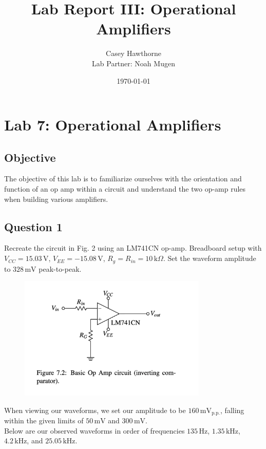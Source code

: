 \documentclass{article}
\title{Lab Report III: Operational Amplifiers}
\author{Casey Hawthorne \\ Lab Partner: Noah Mugen}
\date{\today}
\begin{document}
\maketitle

\section*{Lab 7: Operational Amplifiers}

\subsection*{Objective}
The objective of this lab is to familiarize ourselves with the orientation 
and function of an op amp within a circuit and understand the two op-amp rules 
when building various amplifiers.

\subsection*{Question 1}
Recreate the circuit in Fig. 2 using an LM741CN op-amp. 
Breadboard setup with 
\( V_{CC} = 15.03 \, \text{V} \), \( V_{EE} = -15.08 \, \text{V} \), \( R_{g} = R_{in} = 10 \, \text{k}\Omega \). 
Set the waveform amplitude to \( 328 \, \text{mV} \) peak-to-peak.

\begin{figure}[H]
    \centering
    \includegraphics[width=0.8\textwidth]{img/Lab 7/1_1.png} 
    \caption{}
\end{figure}

When viewing our waveforms, we set our amplitude to be \( 160 \, \text{mV}_{\text{p.p.}} \), falling within the given
limits of \( 50 \, \text{mV} \) and \( 300 \, \text{mV} \). 
\\
Below are our observed waveforms in order of frequencies \( 135 \, \text{Hz} \), \( 1.35 \, \text{kHz} \), \( 4.2 \, \text{kHz} \), and
\( 25.05 \, \text{kHz} \).
\end{document}
